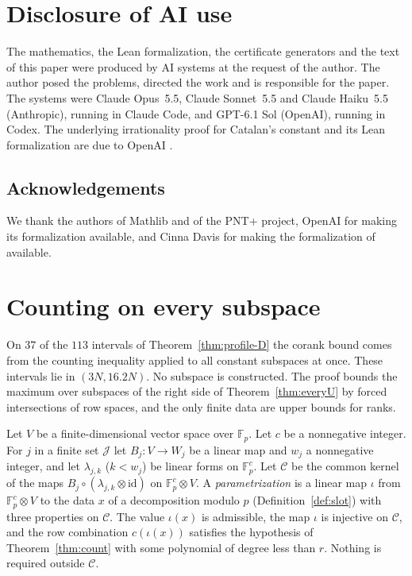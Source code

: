 \documentclass[11pt]{amsart}
\theoremstyle{definition}
\theoremstyle{remark}
\numberwithin{equation}{section}
\newcommand{\F}{\mathbb F}
\begin{document}
\section*{Disclosure of AI use}
The mathematics, the Lean formalization, the certificate generators and the text of this paper were produced
by AI systems at the request of the author. The author posed the problems, directed the work and is
responsible for the paper. The systems were Claude Opus~5.5, Claude Sonnet~5.5 and Claude Haiku~5.5
(Anthropic), running in Claude Code, and GPT-6.1 Sol (OpenAI), running in Codex. The underlying
irrationality proof for Catalan's constant and its Lean formalization are due to OpenAI \cite{OpenAI2026}.

\subsection*{Acknowledgements}
We thank the authors of Mathlib and of the PNT+ project, OpenAI for making its formalization available, and
Cinna Davis for making the formalization of \cite{Davis2026} available.

\appendix
\section{Counting on every subspace}\label{app:windows}

On $37$ of the $113$ intervals of Theorem~\ref{thm:profile-D} the corank bound comes from the counting
inequality applied to all constant subspaces at once. These intervals lie in $(3N,16.2N)$. No subspace is
constructed. The proof bounds the maximum over subspaces of the right side of Theorem~\ref{thm:everyU} by forced intersections of row spaces, and the
only finite data are upper bounds for ranks.

Let $V$ be a finite-dimensional vector space over $\F_p$. Let $c$ be a nonnegative integer. For $j$ in a finite
set $\mathcal J$ let $B_j\colon V\to W_j$ be a linear map and $w_j$ a nonnegative integer, and let $\lambda_{j,k}$ ($k<w_j$) be linear forms on
$\F_p^c$. Let $\mathcal C$ be the common kernel of the maps $B_j\circ(\lambda_{j,k}\otimes\mathrm{id})$ on $\F_p^c\otimes V$. A \emph{parametrization} is a linear map
$\iota$ from $\F_p^c\otimes V$ to the data $x$ of a decomposition modulo $p$ (Definition~\ref{def:slot}) with three properties on $\mathcal C$. The value
$\iota(x)$ is admissible, the map $\iota$ is injective on $\mathcal C$, and the row combination $c(\iota(x))$ satisfies the hypothesis of
Theorem~\ref{thm:count} with some polynomial of degree less than $r$. Nothing is required outside $\mathcal C$.
\end{document}
